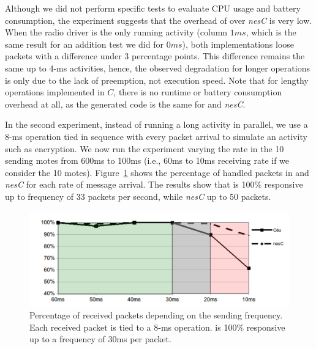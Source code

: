 Although we did not perform specific tests to evaluate CPU usage and battery 
consumption, the experiment suggests that the overhead of \CEU over \emph{nesC} 
is very low.
%
When the radio driver is the only running activity (column $1ms$, which is the 
same result for an addition test we did for $0ms$), both implementations loose 
packets with a difference under 3 percentage points.
This difference remains the same up to 4-ms activities, hence, the observed 
degradation for longer operations is only due to the lack of preemption, not 
execution speed.
%
Note that for lengthy operations implemented in $C$, there is no runtime or 
battery consumption overhead at all, as the generated code is the same for \CEU 
and \emph{nesC}.

In the second experiment, instead of running a long activity in parallel, we 
use a 8-ms operation tied in sequence with every packet arrival to simulate an 
activity such as encryption.
We now run the experiment varying the rate in the 10 sending motes from 600ms 
to 100ms (i.e., 60ms to 10ms receiving rate if we consider the 10 motes).
%
Figure~\ref{fig.radio2} shows the percentage of handled packets in \CEU and 
\emph{nesC} for each rate of message arrival.
%
%
The results show that \CEU is 100\% responsive up to frequency of 33 packets 
per second, while \emph{nesC} up to 50 packets.

\begin{figure}[t]
\includegraphics[width=\linewidth,clip=true,trim=35px 0px 10px 0px]{radio2}
\caption{  Percentage of received packets depending on the sending frequency.  
\newline
{\small %
Each received packet is tied to a 8-ms operation.
\CEU is 100\% responsive up to a frequency of 30ms per packet.
}%
\label{fig.radio2}
}
\end{figure}



